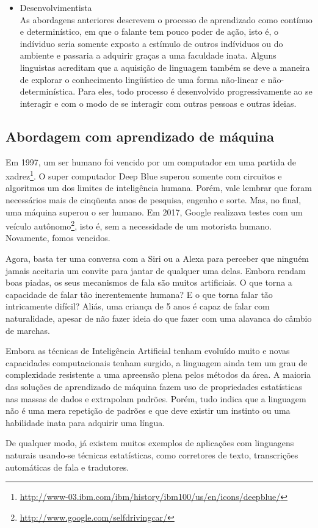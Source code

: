 \begin{itemize}
\item Desenvolvimentista \\
As abordagens anteriores descrevem o processo de aprendizado como contínuo e determinístico, em que o falante tem pouco poder de ação, isto é, o indíviduo seria somente exposto a estímulo de outros indíviduos ou do ambiente e passaria a adquirir graças a uma faculdade inata. Alguns linguistas acreditam que a aquisição de linguagem também se deve a maneira de explorar o conhecimento lingüístico de uma forma não-linear e não-determinística. Para eles, todo processo é desenvolvido progressivamente ao se interagir e com o modo de se interagir com outras pessoas e outras ideias.

\end{itemize}

\subsection{Abordagem com aprendizado de máquina}

Em 1997, um ser humano foi vencido por um computador em uma partida de xadrez\footnote{\url{http://www-03.ibm.com/ibm/history/ibm100/us/en/icons/deepblue/}}. O super computador Deep Blue superou somente com circuitos e algoritmos um dos limites de inteligência humana. Porém, vale lembrar que foram necessários mais de cinqüenta anos de pesquisa, engenho e sorte. Mas, no final, uma máquina superou o ser humano. Em 2017, Google realizava testes com um veículo autônomo\footnote{\url{http://www.google.com/selfdrivingcar/}}, isto é, sem a necessidade de um motorista humano. Novamente, fomos vencidos.

Agora, basta ter uma conversa com a Siri ou a Alexa para perceber que ninguém jamais aceitaria um convite para jantar de qualquer uma delas. Embora rendam boas piadas, os seus mecanismos de fala são muitos artificiais. O que torna a capacidade de falar tão inerentemente humana? E o que torna falar tão intricamente difícil? Aliás, uma criança de 5 anos é capaz de falar com naturalidade, apesar de não fazer ideia do que fazer com uma alavanca do câmbio de marchas.

Embora as técnicas de Inteligência Artificial tenham evoluído muito e novas capacidades computacionais tenham surgido, a linguagem ainda tem um grau de complexidade resistente a uma apreensão plena pelos métodos da área. A maioria das soluções de aprendizado de máquina fazem uso de propriedades estatísticas nas massas de dados e extrapolam padrões. Porém, tudo indica que a linguagem não é uma mera repetição de padrões e que deve existir um instinto ou uma habilidade inata para adquirir uma língua.

De qualquer modo, já existem muitos exemplos de aplicações com linguagens naturais usando-se técnicas estatísticas, como corretores de texto, transcrições automáticas de fala e tradutores.